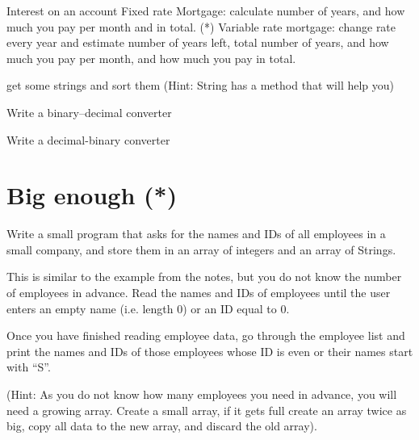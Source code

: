 
Interest on an account
Fixed rate Mortgage: calculate number of years, and how much you pay
   per month and in total.
(*) Variable rate mortgage: change rate every year and estimate number
   of years left, total number of years, and how much you pay per
   month, and how much you pay in total.



get some strings and sort them (Hint: String has a method that will
help you)


Write a binary--decimal converter

Write a decimal-binary converter


\section{Big enough (*)}
\label{sec:big-enough}

Write a small program that asks for the names and IDs of all employees
in a small company, and store them in an array of integers and an
array of Strings. 

This is similar to the example from the notes, but you do not know the
number of employees in advance. Read the names and IDs of employees
until the user enters an empty name (i.e. length 0) or an ID equal to
0.

Once you have finished reading employee data, go through the employee
list and print the names and IDs of
those employees whose ID is even or their names start with ``S''. 

(Hint: As you do not know how many employees you need in advance, you
will need a growing array. Create a small array, if it gets full
create an array twice as big, copy all data to the new array, and
discard the old array).


